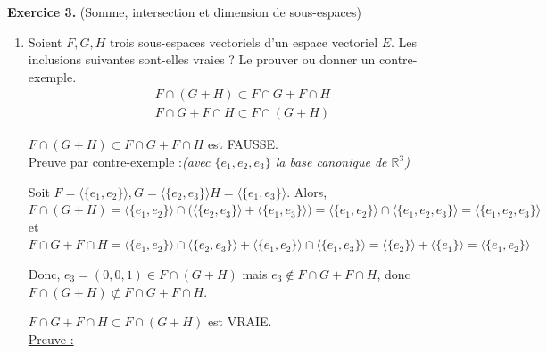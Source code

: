 \documentclass[a4paper, 10pt]{report}
\begin{document}
	\newpage
	
	\fancyhf{}
	\renewcommand{\headrule}
	{\rule{\textwidth}{0pt}}
	
	\noindent
	\textbf{Exercice 3.} (Somme, intersection et dimension de sous-espaces)\\
	
	\begin{enumerate}[label=\arabic*.]
		\item Soient $F, G, H$ trois sous-espaces vectoriels d'un espace
		vectoriel $E$. Les inclusions suivantes sont-elles vraies ?
		Le prouver ou donner un contre-exemple.
		\begin{gather*}
			F \cap (G + H) \subset F \cap G + F \cap H \\
			F \cap G + F \cap H \subset F \cap (G + H)
		\end{gather*}
		
		\colorbox{solution}
		{
			\begin{minipage}{0.9\textwidth}
				$F \cap (G + H) \subset F \cap G + F \cap H$ est FAUSSE.\\
				\underline{Preuve par contre-exemple} :\textit{(avec
					$\{e_1, e_2, e_3\}$ la base canonique de
					$\mathbb{R}^3$)}\vspace{6pt}
				
				Soit $F = \langle\{e_1, e_2\}\rangle,
					G = \langle\{e_2, e_3\}\rangle
					H = \langle\{e_1, e_3\}\rangle$. Alors,\\
				$F \cap (G + H) = \langle\{e_1, e_2\}\rangle \cap
					\big(\langle\{e_2, e_3\}\rangle +
						\langle\{e_1, e_3\}\rangle\big)
					= \langle\{e_1, e_2\}\rangle \cap 
					\langle\{e_1, e_2, e_3\}\rangle
					= \langle\{e_1, e_2, e_3\}\rangle$\\
				et $F \cap G + F \cap H
					= \langle\{e_1, e_2\}\rangle \cap
					\langle\{e_2, e_3\}\rangle
					+ \langle\{e_1, e_2\}\rangle \cap
					\langle\{e_1, e_3\}\rangle
					= \langle\{e_2\}\rangle + \langle\{e_1\}\rangle
					=\langle\{e_1, e_2\}\rangle$\vspace{6pt}
				
				Donc, $e_3 = (0,0,1) \in F \cap (G + H)$ mais
				$e_3 \not\in F \cap G + F \cap H$, donc
				$F \cap (G + H) \not\subset F \cap G + F \cap H$.\vspace{12pt}
				
				$F \cap G + F \cap H \subset F \cap (G + H)$ est VRAIE.\\
				\underline{Preuve :}\vspace{6pt}
				

\end{minipage}}
\end{enumerate}
\end{document}
